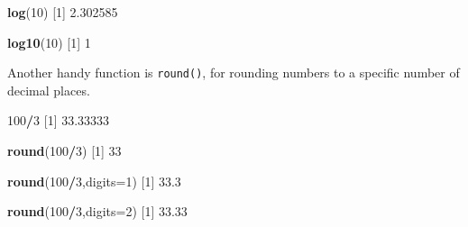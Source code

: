 \documentclass[
]{book}
\newenvironment{Shaded}{\begin{snugshade}}{\end{snugshade}}
\newcommand{\DataTypeTok}[1]{\textcolor[rgb]{0.13,0.29,0.53}{#1}}
\newcommand{\DecValTok}[1]{\textcolor[rgb]{0.00,0.00,0.81}{#1}}
\newcommand{\FloatTok}[1]{\textcolor[rgb]{0.00,0.00,0.81}{#1}}
\newcommand{\KeywordTok}[1]{\textcolor[rgb]{0.13,0.29,0.53}{\textbf{#1}}}
\newcommand{\NormalTok}[1]{#1}
\newcommand{\OperatorTok}[1]{\textcolor[rgb]{0.81,0.36,0.00}{\textbf{#1}}}
\begin{document}
\begin{Shaded}
\begin{Highlighting}[]
\KeywordTok{log}\NormalTok{(}\DecValTok{10}\NormalTok{)}
\NormalTok{[}\DecValTok{1}\NormalTok{] }\FloatTok{2.302585}
\end{Highlighting}
\end{Shaded}

\begin{Shaded}
\begin{Highlighting}[]
\KeywordTok{log10}\NormalTok{(}\DecValTok{10}\NormalTok{)}
\NormalTok{[}\DecValTok{1}\NormalTok{] }\DecValTok{1}
\end{Highlighting}
\end{Shaded}

Another handy function is \texttt{round()}, for rounding numbers to a specific number of decimal places.

\begin{Shaded}
\begin{Highlighting}[]
\DecValTok{100}\OperatorTok{/}\DecValTok{3}
\NormalTok{[}\DecValTok{1}\NormalTok{] }\FloatTok{33.33333}
\end{Highlighting}
\end{Shaded}

\begin{Shaded}
\begin{Highlighting}[]
\KeywordTok{round}\NormalTok{(}\DecValTok{100}\OperatorTok{/}\DecValTok{3}\NormalTok{)}
\NormalTok{[}\DecValTok{1}\NormalTok{] }\DecValTok{33}
\end{Highlighting}
\end{Shaded}

\begin{Shaded}
\begin{Highlighting}[]
\KeywordTok{round}\NormalTok{(}\DecValTok{100}\OperatorTok{/}\DecValTok{3}\NormalTok{,}\DataTypeTok{digits=}\DecValTok{1}\NormalTok{)}
\NormalTok{[}\DecValTok{1}\NormalTok{] }\FloatTok{33.3}
\end{Highlighting}
\end{Shaded}

\begin{Shaded}
\begin{Highlighting}[]
\KeywordTok{round}\NormalTok{(}\DecValTok{100}\OperatorTok{/}\DecValTok{3}\NormalTok{,}\DataTypeTok{digits=}\DecValTok{2}\NormalTok{)}
\NormalTok{[}\DecValTok{1}\NormalTok{] }\FloatTok{33.33}
\end{Highlighting}
\end{Shaded}
\end{document}
